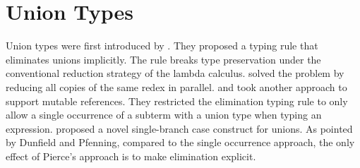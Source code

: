 \section{Union Types}
\begin{comment}
Set-theoretic unions have sound theory and extensively studied in
mathematics. Set-theoretic unions correspond to union types or
disjoint union types in programming languages. Disjoint union types
are also called sum types or variants.  Constructors are explicitly
labeled in disjoint union types and expressions are manipulated using
corresponding labels. Few other interesting calculi (and this paper)
do not use labels and provide type-based union elimination.
\end{comment}
Union types were first introduced by \cite{macqueen1984ideal}.
They proposed a typing rule that eliminates unions implicitly.
The rule breaks type preservation under
the conventional reduction strategy of the lambda calculus.
\cite{barbanera1995intersection} solved the problem by reducing all
copies of the same redex in parallel.
\cite{dunfield2003type} and \cite{dunfield2014elaborating} took another approach to support
mutable references. They restricted the elimination typing rule to only allow a single
occurrence of a subterm with a union type when typing an expression.
\cite{pierce1991programming} proposed a novel single-branch case construct
for unions. As pointed by Dunfield and Pfenning, compared to the single
occurrence approach, the
only effect of Pierce's approach
is to make elimination explicit.
\begin{comment}
Moreover, while \cite{dunfield2014elaborating} shows that
subtyping is not necessary for elaboration, it is not obvious how to generalize
elaboration to support subtyping relations such as
\lstinline{Student <: Person} without using the subtyping rule. If the
elaboration were generalized further to support such a subtyping relation, then
a student with type \lstinline{Student | Person} can also be tagged
non-deterministically.
\end{comment}



